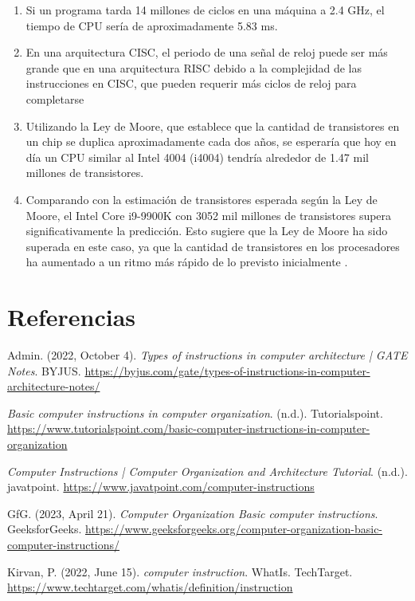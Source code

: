 \documentclass{article}
\begin{document}
\begin{enumerate}
    \item Si un programa tarda 14 millones de ciclos en una máquina a 2.4 GHz, el tiempo de CPU sería de aproximadamente 5.83 ms.
    
    \item En una arquitectura CISC, el periodo de una señal de reloj puede ser más grande que en una arquitectura RISC debido a la complejidad de las instrucciones en CISC, que pueden requerir más ciclos de reloj para completarse 
    
    \item Utilizando la Ley de Moore, que establece que la cantidad de transistores en un chip se duplica aproximadamente cada dos años, se esperaría que hoy en día un CPU similar al Intel 4004 (i4004) tendría alrededor de 1.47 mil millones de transistores.
    
    \item Comparando con la estimación de transistores esperada según la Ley de Moore, el Intel Core i9-9900K con 3052 mil millones de transistores supera significativamente la predicción. Esto sugiere que la Ley de Moore ha sido superada en este caso, ya que la cantidad de transistores en los procesadores ha aumentado a un ritmo más rápido de lo previsto inicialmente .
\end{enumerate}

\section{Referencias}
\begin{thebibliography}{9}
Admin. (2022, October 4). \textit{Types of instructions in computer architecture | GATE Notes}. BYJUS. 
\url{https://byjus.com/gate/types-of-instructions-in-computer-architecture-notes/}

\textit{Basic computer instructions in computer organization}. (n.d.). Tutorialspoint. 
\url{https://www.tutorialspoint.com/basic-computer-instructions-in-computer-organization}

\textit{Computer Instructions | Computer Organization and Architecture Tutorial}. (n.d.). javatpoint. 
\url{https://www.javatpoint.com/computer-instructions}

GfG. (2023, April 21). \textit{Computer Organization Basic computer instructions}. GeeksforGeeks. 
\url{https://www.geeksforgeeks.org/computer-organization-basic-computer-instructions/}

Kirvan, P. (2022, June 15). \textit{computer instruction}. WhatIs. TechTarget. 
\url{https://www.techtarget.com/whatis/definition/instruction}

\end{thebibliography}
\end{document}
